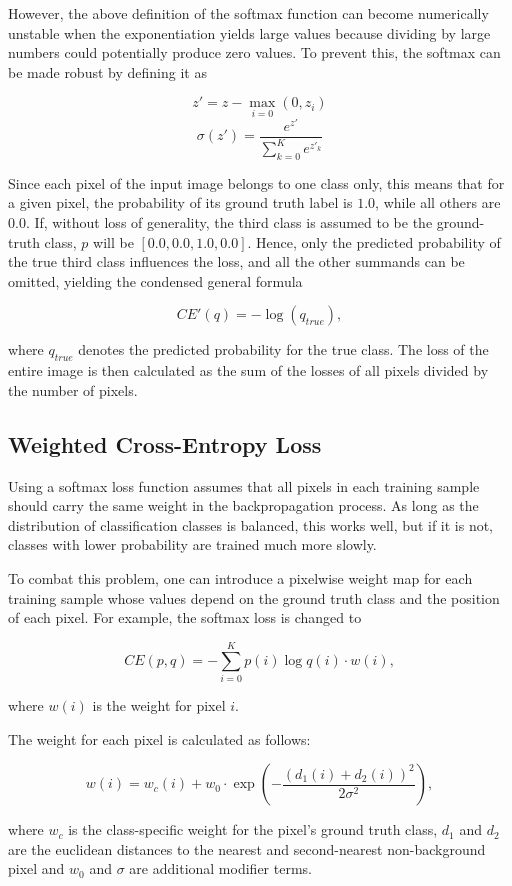 However, the above definition of the softmax function can become numerically unstable when the exponentiation yields large values because dividing by large numbers could potentially produce zero values. To prevent this, the softmax can be made robust by defining it as

\[z' = z - \max \limits_{i = 0}(0, z_i)\]
\[\sigma(z') = \frac{e^{z'}}{\sum_{k=0}^{K} e^{z'_{{k}}}}\]

\noindent Since each pixel of the input image belongs to one class only, this means that for a given pixel, the probability of its ground truth label is $1.0$, while all others are $0.0$. If, without loss of generality, the third class is assumed to be the ground-truth class, $p$ will be $[0.0, 0.0, 1.0, 0.0]$.  Hence, only the predicted probability of the true third class influences the loss, and all the other summands can be omitted, yielding the condensed general formula

\[CE'(q) = - \log(q_{true}),\]

\noindent where $q_{true}$ denotes the predicted probability for the true class. The loss of the entire image is then calculated as the sum of the losses of all pixels divided by the number of pixels.


		\subsection{Weighted Cross-Entropy Loss}

Using a softmax loss function assumes that all pixels in each training sample should carry the same weight in the backpropagation process. As long as the distribution of classification classes is balanced, this works well, but if it is not, classes with lower probability are trained much more slowly.

To combat this problem, one can introduce a pixelwise weight map for each training sample whose values depend on the ground truth class and the position of each pixel. For example, the softmax loss is changed to

\[CE(p, q) = -\sum \limits_{i = 0}^{K} p(i) \log q(i) \cdot w(i),\]

\noindent where $w(i)$ is the weight for pixel $i$.

 The weight for each pixel is calculated as follows:

\[ w(i) = w_c(i) + w_0 \cdot \exp \left (- \frac{(d_1(i) + d_2(i))^2}{2\sigma^2} \right ), \]

\noindent where $w_c$ is the class-specific weight for the pixel's ground truth class, $d_1$ and $d_2$ are the euclidean distances to the nearest and second-nearest non-background pixel and $w_0$ and $\sigma$ are additional modifier terms. 


